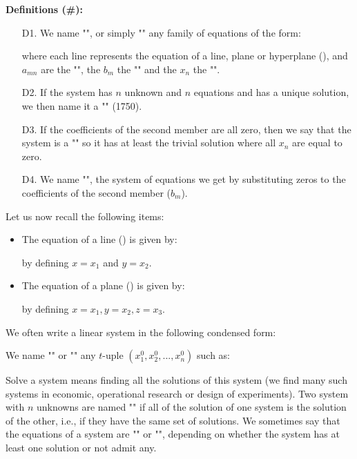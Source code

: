 \textbf{Definitions (\#\mydef):}
\begin{enumerate}
	\item[D1.] We name "", or simply "" any family of equations of the form:
	
where each line represents the equation of a line, plane or hyperplane (), and $a_{mn}$ are the "", the $b_m$ the "" and the $x_n$ the "".

	\item[D2.] If the system has $n$ unknown and $n$ equations and has a unique solution, we then name it a "" (1750).

	\item[D3.] If the coefficients of the second member are all zero, then we say that the system is a "" so it has at least the trivial solution where all $x_n$ are equal to zero.
	
	\item[D4.] We name "", the system of equations we get by substituting zeros to the coefficients of the second member ($b_m$).
	\end{enumerate}
Let us now recall the following items:
	\begin{itemize}
		\item The equation of a line () is given by:
			
		by defining $x=x_1$ and $y=x_2$.
		\item The equation of a plane () is given by:
			
		by defining $x=x_1, y=x_2, z=x_3$.
	\end{itemize}
We often write a linear system in the following condensed form:
	
We name "" or "" any $t$-uple $(x_1^0,x_2^0,...,x_n^0)$ such as:
	
Solve a system means finding all the solutions of this system (we find many such systems in economic, operational research or design of experiments). Two system with $n$ unknowns are named  "" if all of the solution of one system is the solution of the other, i.e., if they have the same set of solutions. We sometimes say that the equations of a system are "" or "", depending on whether the system has at least one solution or not admit any.


